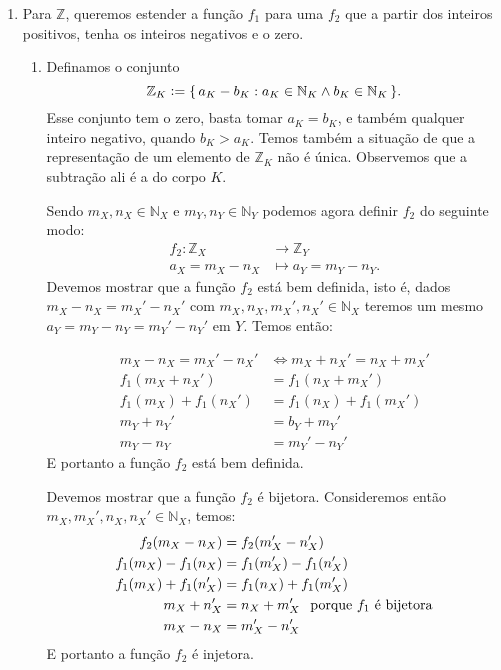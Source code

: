 \documentclass[../main.tex]{subfiles}
\begin{document}
\begin{dem}
\begin{enumerate}
    \item Para $\mathbb{Z}$, queremos estender a função $f_1$ para uma $f_2$ que a partir dos inteiros positivos, tenha os inteiros negativos e o zero.
        \begin{enumerate}
            \item 
            Definamos o conjunto 
            \[ \mathbb{Z}_K \vcentcolon= \{\,a_K - b_K : a_K \in \mathbb{N}_K \land b_K \in \mathbb{N}_K \,\}. \] 
            Esse conjunto tem o zero, basta tomar $a_K = b_K$, e também qualquer inteiro negativo, quando $b_K > a_K$. Temos também a situação de que a representação de um elemento de $\mathbb{Z}_K$ não é única. Observemos que a subtração ali é a do corpo $K$.
            
            Sendo $m_X, n_X \in \mathbb{N}_X$ e $m_Y, n_Y \in \mathbb{N}_Y$ podemos agora definir $f_2$ do seguinte modo:
            \begin{align*}
                f_2 \colon \mathbb{Z}_X &\to \mathbb{Z}_Y \\
                a_X = m_X - n_X &\mapsto a_Y = m_Y - n_Y.
            \end{align*}
            Devemos mostrar que a função $f_2$ está bem definida, isto é, dados $m_X - n_X = m_X' - n_X'$ com 
            $m_X, n_X, m_X', n_X' \in \mathbb{N}_X$ teremos um mesmo $a_Y = m_Y - n_Y = m_Y' - n_Y'$ em $Y$. Temos então:
        
            \begin{align*}
                m_X - n_X = m_X' - n_X' &\iff m_X + n_X' = n_X + m_X' \\
                f_1(m_X + n_X') &= f_1(n_X+m_X') \\
                f_1(m_X) + f_1(n_X') &= f_1(n_X) + f_1(m_X') \\
                m_Y + n_Y' &= b_Y + m_Y' \\
                m_Y - n_Y &= m_Y' - n_Y' 
            \end{align*}
            E portanto a função $f_2$ está bem definida.
        
            Devemos mostrar que a função $f_2$ é bijetora. Consideremos então ${m_X, m_X', n_X, n_X' \in \mathbb{N}_X}$, temos:
            \begin{align*}
                f_2(m_X - n_X) &= f_2(m_X' - n_X') \\
                f_1(m_X) - f_1(n_X) &= f_1(m_X') - f_1(n_X') \\
                f_1(m_X) + f_1(n_X') &= f_1(n_X) + f_1(m_X') \\
                m_X + n_X' &= n_X + m_X' \text{\hspace{4pt} porque $f_1$ é bijetora} \\
                m_X - n_X &= m_X' - n_X'
            \end{align*}
            E portanto a função $f_2$ é injetora.
        

\end{enumerate}
\end{enumerate}
\end{dem}
\end{document}
